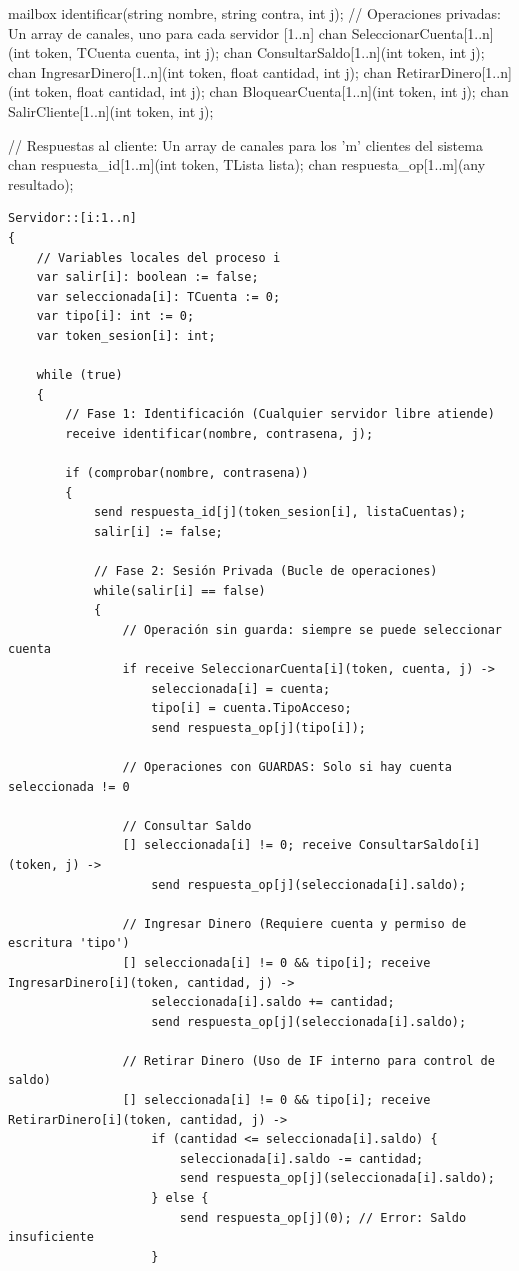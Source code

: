 mailbox identificar(string nombre, string contra, int j);
// Operaciones privadas: Un array de canales, uno para cada servidor [1..n]
chan SeleccionarCuenta[1..n](int token, TCuenta cuenta, int j);
chan ConsultarSaldo[1..n](int token, int j);
chan IngresarDinero[1..n](int token, float cantidad, int j);
chan RetirarDinero[1..n](int token, float cantidad, int j);
chan BloquearCuenta[1..n](int token, int j);
chan SalirCliente[1..n](int token, int j);

// Respuestas al cliente: Un array de canales para los 'm' clientes del sistema
chan respuesta_id[1..m](int token, TLista lista);
chan respuesta_op[1..m](any resultado);
\begin{lstlisting}[caption=Servidor Bancario con Estado]
Servidor::[i:1..n]
{
    // Variables locales del proceso i
    var salir[i]: boolean := false;
    var seleccionada[i]: TCuenta := 0;
    var tipo[i]: int := 0;
    var token_sesion[i]: int;

    while (true)
    {
        // Fase 1: Identificación (Cualquier servidor libre atiende)
        receive identificar(nombre, contrasena, j); 

        if (comprobar(nombre, contrasena)) 
        {
            send respuesta_id[j](token_sesion[i], listaCuentas);
            salir[i] := false; 

            // Fase 2: Sesión Privada (Bucle de operaciones)
            while(salir[i] == false) 
            {
                // Operación sin guarda: siempre se puede seleccionar cuenta
                if receive SeleccionarCuenta[i](token, cuenta, j) ->
                    seleccionada[i] = cuenta;
                    tipo[i] = cuenta.TipoAcceso;
                    send respuesta_op[j](tipo[i]);

                // Operaciones con GUARDAS: Solo si hay cuenta seleccionada != 0
                
                // Consultar Saldo
                [] seleccionada[i] != 0; receive ConsultarSaldo[i](token, j) ->
                    send respuesta_op[j](seleccionada[i].saldo);

                // Ingresar Dinero (Requiere cuenta y permiso de escritura 'tipo')
                [] seleccionada[i] != 0 && tipo[i]; receive IngresarDinero[i](token, cantidad, j) ->
                    seleccionada[i].saldo += cantidad;
                    send respuesta_op[j](seleccionada[i].saldo);

                // Retirar Dinero (Uso de IF interno para control de saldo)
                [] seleccionada[i] != 0 && tipo[i]; receive RetirarDinero[i](token, cantidad, j) ->
                    if (cantidad <= seleccionada[i].saldo) {
                        seleccionada[i].saldo -= cantidad;
                        send respuesta_op[j](seleccionada[i].saldo);
                    } else {
                        send respuesta_op[j](0); // Error: Saldo insuficiente
                    }


\end{lstlisting}
